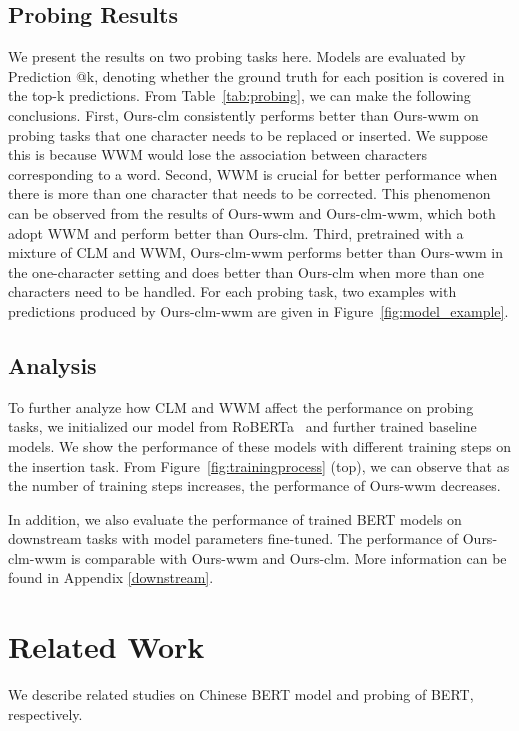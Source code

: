 \documentclass[11pt]{article}
\begin{document}
\subsection{Probing Results}
\label{section:experiment-probing}
We present the results on two probing tasks here. Models are evaluated by Prediction @k, denoting whether the ground truth for each position is covered in the top-k predictions.
From Table~\ref{tab:probing}, we can make the following conclusions.
First, Ours-clm consistently performs better than Ours-wwm on probing tasks that one character needs to be replaced or inserted. We suppose this is because WWM would lose the association between characters corresponding to a word.
Second, WWM is crucial for better performance when there is more than one character that needs to be corrected. This phenomenon can be observed from the results of Ours-wwm and Ours-clm-wwm, which both adopt WWM and perform better than Ours-clm. Third, pretrained with a mixture of CLM and WWM, Ours-clm-wwm performs better than Ours-wwm in the one-character setting and does better than Ours-clm when more than one characters need to be handled. For each probing task, two examples with predictions produced by Ours-clm-wwm are given in Figure~\ref{fig:model_example}.

\subsection{Analysis}
To further analyze how CLM and WWM affect the performance on probing tasks, we initialized our model from RoBERTa~\cite{cui2019pre} and further trained baseline models. We show the performance of these models with different training steps on the insertion task.
From Figure~\ref{fig:trainingprocess}  (top), we can observe that as the number of training steps increases, the performance of Ours-wwm decreases. 

In addition, we also evaluate the performance of trained BERT models on downstream tasks with model parameters fine-tuned. The performance of Ours-clm-wwm is comparable with Ours-wwm and Ours-clm. More information can be found in Appendix \ref{downstream}.

\section{Related Work}
We describe related studies on Chinese BERT model and probing of BERT, respectively.
\end{document}
